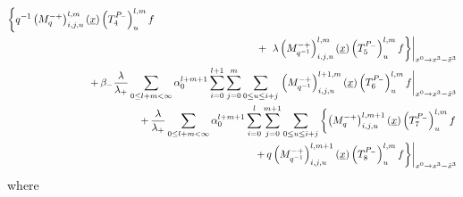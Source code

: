 \documentclass[a4paper,11pt,oneside]{article}
\begin{document}
\begin{eqnarray}
\left\{ %
q^{-1}\left( M_{q}^{-+}\right) _{i,j,u}^{l,m}\left(\underline{x}\right) 
\left(T^{P_-}_4\right)^{l,m}_uf\right.\nonumber\\ 
&&\hspace*{3.cm}+\left.\left.\,\lambda \left( M_{q^{-1}}^{-+}\right)
_{i,j,u}^{l,m}\left( \underline{x}\right)
\left(T^{P_-}_5\right)^{l,m}_uf \right\}
\right| _{x^{0}\rightarrow x^{3}-\tilde{x}^{3}} 
\nonumber \\
&&\hspace*{-3.cm}+\,\beta_-\frac{\lambda }{\lambda _{+}}
 \sum_{0\leq l+m<\infty }\alpha
_{0}^{l+m+1}\sum_{i=0}^{l+1}\sum_{j=0}^{m}\sum_{0\leq u\leq i+j}\left.\left(
M_{q^{-1}}^{-+}\right) _{i,j,u}^{l+1,m}\left( \underline{x}\right)   
\left(T^{P_-}_6\right)^{l,m}_uf
\right| _{x^{0}\rightarrow x^{3}-\tilde{x}%
^{3}}  \nonumber \\
&&\hspace*{-3.cm}+\,\frac{\lambda }{\lambda _{+}}\sum_{0\leq l+m<\infty
}\alpha _{0}^{l+m+1}\sum_{i=0}^{l}\sum_{j=0}^{m+1}\sum_{0\leq u\leq i+j}%
\left\{ \left( M_{q}^{-+}\right) _{i,j,u}^{l,m+1}
\left( \underline{x}\right)\left(T^{P_-}_7\right)^{l,m}_uf\right.\nonumber\\
&&\hspace*{3cm}\left.\left.+\,q\left( M_{q^{-1}}^{-+}\right)
_{i,j,u}^{l,m+1}\left( \underline{x}\right) 
\left(T^{P_-}_8\right)^{l,m}_uf\right\}
\right| _{x^{0}\rightarrow
x^{3}-\tilde{x}^{3}}   \nonumber
\end{eqnarray}
where
\end{document}
